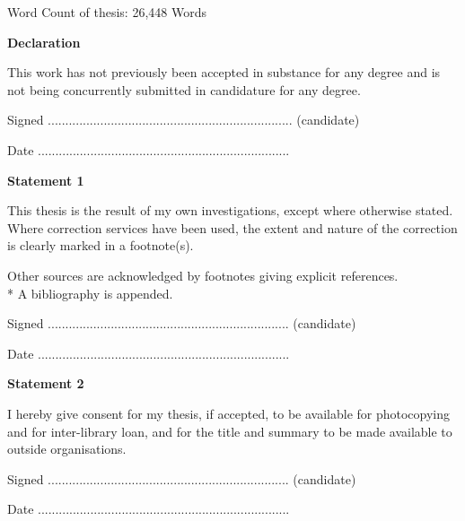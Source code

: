 \begin{originality}

Word Count of thesis: 26,448 Words

\textbf{Declaration}

{
This work has not previously been accepted in substance for any degree and is not being concurrently submitted in candidature for any degree. \par }

Signed ...................................................................... (candidate)

Date ........................................................................

\textbf{Statement 1}

{
This thesis is the result of my own investigations, except where otherwise stated. Where correction services have been used, the extent and nature of the correction is clearly marked in a footnote(s). \par }

{
Other sources are acknowledged by footnotes giving explicit references. \\*
A bibliography is appended. \par }

Signed ..................................................................... (candidate)

Date ........................................................................

\textbf{Statement 2}

{
I hereby give consent for my thesis, if accepted, to be available for photocopying and for inter-library loan, and for the title and summary to be made available to outside organisations. \par }

Signed ..................................................................... (candidate)

Date ........................................................................

\end{originality}